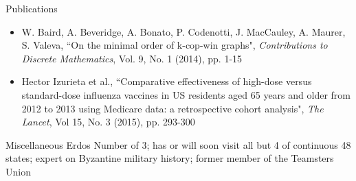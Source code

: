 \documentclass{resume} %
\begin{document}
\begin{rSection}{Publications}
\begin{itemize}
    \item W. Baird, A. Beveridge, A. Bonato, P. Codenotti, J. MacCauley, A. Maurer, S. Valeva, ``On the minimal order of k-cop-win graphs", {\em Contributions to Discrete Mathematics}, Vol. 9, No. 1 (2014), pp. 1-15 
    \item Hector Izurieta et al., ``Comparative effectiveness of high-dose versus standard-dose influenza vaccines in US residents aged 65 years and older from 2012 to 2013 using Medicare data: a retrospective cohort analysis", {\em The Lancet}, Vol 15, No. 3 (2015), pp. 293-300 
\end{itemize}
\end{rSection}



\begin{rSection}{Miscellaneous} 
    Erdos Number of 3; has or will soon visit all but 4 of continuous 48 states; expert on Byzantine military history; former member of the Teamsters Union
\end{rSection}






\end{document}

